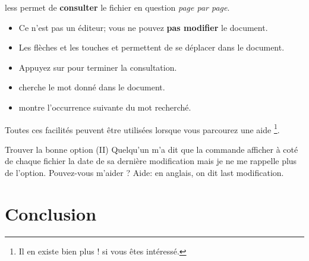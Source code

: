 \documentclass[a4paper,11pt]{style-esi/td}
\begin{document}
		\begin{theorie}{less}
			permet de \textbf{consulter} le fichier en question \emph{page par page}.
			\begin{itemize}
			\item
				Ce n'est pas un éditeur; vous ne pouvez \textbf{pas modifier} le document.
			\item 
				Les flèches et les touches  et 
				permettent de se déplacer dans le document.
			\item 
				Appuyez sur  pour terminer la consultation. 
			\item 
				 cherche le mot donné dans le document.
			\item 
				 montre l'occurrence suivante du mot recherché.
			\end{itemize}
		\end{theorie}

		Toutes ces facilités peuvent être utilisées lorsque vous parcourez
		une aide%
		\footnote{%
			Il en existe bien plus !  si vous êtes intéressé.
		}.

		\begin{Exercice}{Trouver la bonne option (II)}
			Quelqu'un m'a dit que la commande 
			afficher à coté de chaque fichier la date de sa dernière modification
			mais je ne me rappelle plus de l'option. 
			Pouvez-vous m'aider ?
			Aide: en anglais, on dit \og{}last modification\fg{}.
		\end{Exercice}

\section{Conclusion}
\end{document}
